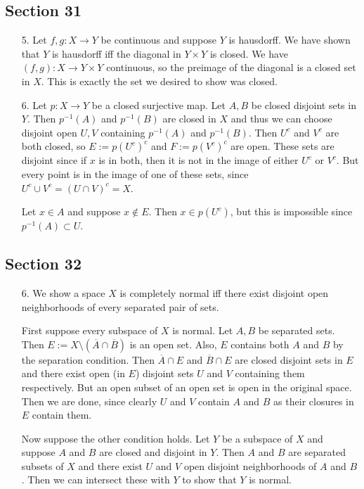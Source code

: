\documentclass[11pt, reqno]{article}
\theoremstyle{plain}
\theoremstyle{definition}
\theoremstyle{remark}
\begin{document}
\subsection*{Section 31}

\begin{enumerate}
    \item[5.] Let $f, g: X \rightarrow Y$ be continuous and suppose $Y$ is hausdorff. We have shown
    that $Y$ is hausdorff iff the diagonal in $Y \times Y$ is closed. We have $(f,g): X \rightarrow Y \times Y$
    continuous, so the preimage of the diagonal is a closed set in $X$. This is exactly the set 
    we desired to show was closed.

    \item[6.] Let $p:X \rightarrow Y$ be a closed surjective map. Let $A, B$ be closed disjoint sets in $Y$. 
    Then $p^{-1}(A)$ and $p^{-1}(B)$ are closed in $X$ and thus we can choose disjoint open 
    $U, V$ containing $p^{-1}(A)$ and $p^{-1}(B)$. Then $U^c$ and $V^c$ are both closed,
    so $E := p(U^c)^c$ and $F := p(V^c)^c$ are open. These sets are disjoint since if $x$ is in both,
    then it is not in the image of either $U^c$ or $V^c$. But every point is in the 
    image of one of these sets, since $U^c \cup V^c = (U \cap V)^c = X$. 

    Let $x \in A$ and suppose $x \notin E$. Then $x \in p(U^c)$, but this is impossible 
    since $p^{-1}(A) \subset U$.
\end{enumerate}

\subsection*{Section 32}
    
\begin{enumerate}
    \item[6.] We show a space $X$ is completely normal iff there exist disjoint 
    open neighborhoods of every separated pair of sets.
    
    First suppose every subspace of $X$ is normal. Let $A, B$ be separated sets. Then 
    $E := X \setminus(\overline{A} \cap \overline{B})$ is an open set. Also,
    $E$ contains both $A$ and $B$ by the separation condition. Then $\overline{A} \cap E$
    and $\overline{B} \cap E$ are closed disjoint sets in $E$ and there exist open (in $E$) disjoint sets 
    $U$ and $V$ containing them respectively. But an open subset of an open set is open in the original
    space. Then we are done, since clearly $U$ and $V$ contain $A$ and $B$ as their closures 
    in $E$ contain them. 

    Now suppose the other condition holds. Let $Y$ be a subspace of $X$ and suppose $A$ and $B$
    are closed and disjoint in $Y$. Then $A$ and $B$ are separated subsets of $X$ and there exist 
    $U$ and $V$ open disjoint neighborhoods of $A$ and $B$. Then we can intersect these with $Y$ 
    to show that $Y$ is normal. 
\end{enumerate}
\end{document}

